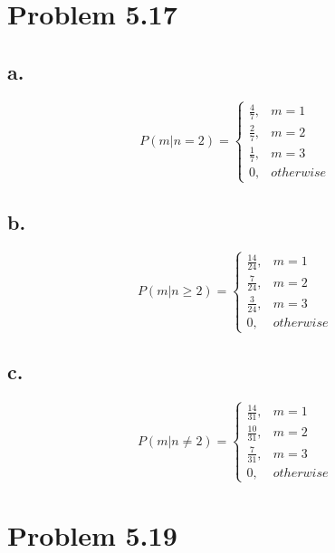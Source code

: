 \documentclass[12pt]{article}
\begin{document}
\section*{Problem 5.17}
\subsection*{a.}
\[P(m|n=2) = \begin{cases}
    \frac{4}{7}, & m = 1 \\
    \frac{2}{7}, & m = 2 \\
    \frac{1}{7}, & m = 3 \\
     0, & otherwise
   \end{cases}
\]

\subsection*{b.}
\[P(m|n\geq2) = \begin{cases}
    \frac{14}{24}, & m = 1 \\
    \frac{7}{24}, & m = 2 \\
    \frac{3}{24}, & m = 3 \\
     0, & otherwise
   \end{cases}
\]

\subsection*{c.}
\[P(m|n\neq2) = \begin{cases}
    \frac{14}{31}, & m = 1 \\
    \frac{10}{31}, & m = 2 \\
    \frac{7}{31}, & m = 3 \\
     0, & otherwise
   \end{cases}
\]

\section*{Problem 5.19}
\end{document}
